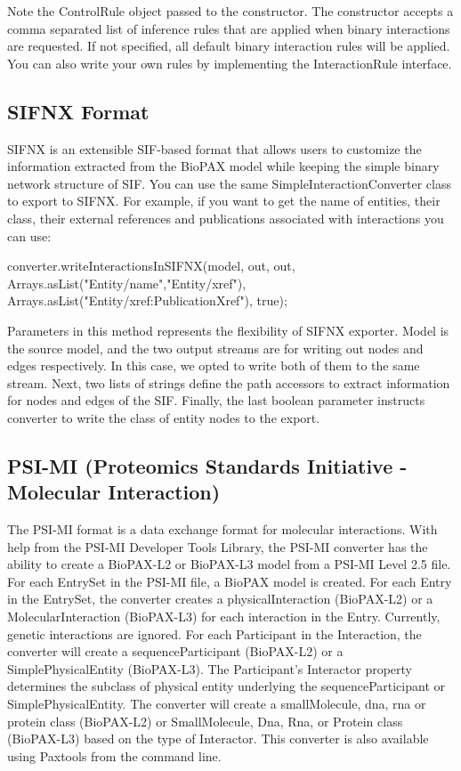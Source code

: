 \documentclass{tufte-book}
\begin{document}
Note the ControlRule object passed to the constructor. The constructor accepts a comma separated list of inference rules that are applied when binary interactions are requested. If not specified, all default binary interaction rules will be applied. You can also write your own rules by implementing the InteractionRule interface. 

\subsection{SIFNX Format}

SIFNX  is an extensible SIF-based format that allows users to customize the information extracted from the BioPAX model while keeping the simple binary network structure of SIF. You can use the same SimpleInteractionConverter class to export to SIFNX. For example, if you want to get the name of entities, their class, their external references and publications associated with interactions you can use:

\begin{javacode}
converter.writeInteractionsInSIFNX(model, 
     out, out, Arrays.asList("Entity/name","Entity/xref"),
    Arrays.asList("Entity/xref:PublicationXref"), true);
\end{javacode}

Parameters in this method represents the flexibility of SIFNX exporter. Model is the source model, and the two output streams are for writing out nodes and edges respectively. In this case, we opted to write both of them to the same stream. Next, two lists of strings define the path accessors to extract information for nodes and edges of the SIF. Finally, the last boolean parameter instructs converter to write the class of entity nodes to the export.

\subsection{PSI-MI (Proteomics Standards Initiative - Molecular Interaction)}
The PSI-MI format is a data exchange format for molecular interactions.  With help from the PSI-MI Developer Tools Library, the PSI-MI converter has the ability to create a BioPAX-L2 or BioPAX-L3 model from a PSI-MI Level 2.5 file.  For each EntrySet in the PSI-MI file, a BioPAX model is created.  For each Entry in the EntrySet, the converter creates a physicalInteraction (BioPAX-L2) or a MolecularInteraction (BioPAX-L3) for each interaction in the Entry.  Currently, genetic interactions are ignored.  For each Participant in the Interaction, the converter will create a sequenceParticipant (BioPAX-L2) or a SimplePhysicalEntity (BioPAX-L3).  The Participant's Interactor property determines the subclass of physical entity underlying the sequenceParticipant or SimplePhysicalEntity.  The converter will create a smallMolecule, dna, rna or protein class (BioPAX-L2) or SmallMolecule, Dna, Rna, or Protein class (BioPAX-L3) based on the type of Interactor.  This converter is also available using Paxtools from the command line.
\end{document}
